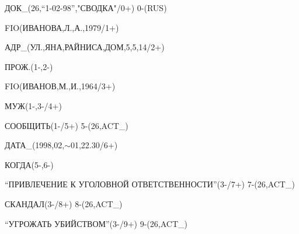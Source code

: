 {\small





\noindent


     ДОК\_(26,``1-02-98'',"СВОДКА"/0+) 0-(RUS)


     


\noindent


     FIO(ИВАНОВА,Л.,А.,1979/1+) 


     


\noindent


     АДР\_(УЛ.,ЯНА,РАЙНИСА,ДОМ,5,5,14/2+) 


     


\noindent


     ПРОЖ.(1-,2-)


     


\noindent


     FIO(ИВАНОВ,М.,И.,1964/3+) 


     


\noindent


     МУЖ(1-,3-/4+) 


     


\noindent


     СООБЩИТЬ(1-/5+) 5-(26,ACT\_)


     


\noindent


     ДАТА\_(1998,02,$\sim$01,22.30/6+) 


     


\noindent


     КОГДА(5-,6-)


     


\noindent


     ``ПРИВЛЕЧЕНИЕ К УГОЛОВНОЙ ОТВЕТСТВЕННОСТИ''(3-/7+) 7-(26,ACT\_)


     


\noindent


     СКАНДАЛ(3-/8+) 8-(26,ACT\_)


     


\noindent


     ``УГРОЖАТЬ УБИЙСТВОМ''(3-/9+) 9-(26,ACT\_)


}
